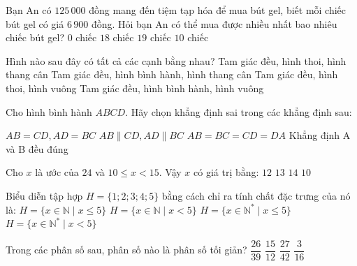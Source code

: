 \documentclass[12pt,a4paper]{article}
\begin{document}
\begin{ex}
Bạn An có $125\,000$ đồng mang đến tiệm tạp hóa để mua bút gel, biết mỗi chiếc bút gel có giá $6\,900$ đồng. Hỏi bạn An có thể mua được nhiều nhất bao nhiêu chiếc bút gel?
\choice
{$0$ chiếc}
{\True $18$ chiếc}
{$19$ chiếc}
{$10$ chiếc}
\end{ex}

\begin{ex}
Hình nào sau đây có tất cả các cạnh bằng nhau?
\choice
{Tam giác đều, hình thoi, hình thang cân}
{Tam giác đều, hình bình hành, hình thang cân}
{\True Tam giác đều, hình thoi, hình vuông}
{Tam giác đều, hình bình hành, hình vuông}
\end{ex}

\begin{ex}
Cho hình bình hành $ABCD$. Hãy chọn khẳng định sai trong các khẳng định sau:
\begin{center}
\end{center}
\choice
{$AB = CD, AD = BC$}
{$AB \parallel CD, AD \parallel BC$}
{\True $AB = BC = CD = DA$}
{Khẳng định A và B đều đúng}
\end{ex}

\begin{ex}
Cho $x$ là ước của $24$ và $10 \le x < 15$. Vậy $x$ có giá trị bằng:
\choice
{\True $12$}
{$13$}
{$14$}
{$10$}
\end{ex}

\begin{ex}
Biểu diễn tập hợp $H = \{1; 2; 3; 4; 5\}$ bằng cách chỉ ra tính chất đặc trưng của nó là:
\choice
{$H = \{x \in \mathbb{N} \mid x \le 5\}$}
{$H = \{x \in \mathbb{N} \mid x < 5\}$}
{\True $H = \{x \in \mathbb{N}^* \mid x \le 5\}$}
{$H = \{x \in \mathbb{N}^* \mid x < 5\}$}
\end{ex}

\begin{ex}
Trong các phân số sau, phân số nào là phân số tối giản?
\choice
{$\dfrac{26}{39}$}
{$\dfrac{15}{12}$}
{$\dfrac{27}{42}$}
{\True $\dfrac{3}{16}$}
\end{ex}
\end{document}
